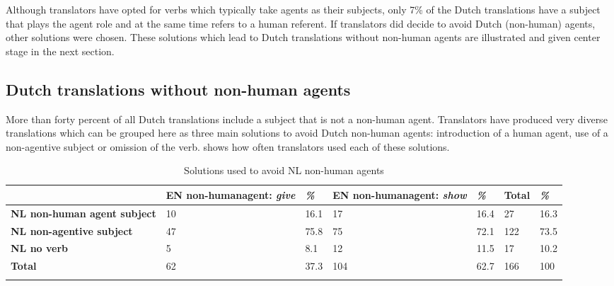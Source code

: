 \documentclass[output=paper]{LSP/langsci}
\begin{document}


Although translators have opted for verbs which typically take agents as their subjects, only 7\% of the Dutch translations have a subject that plays the agent role and at the same time refers to a human referent. If translators did decide to avoid Dutch (non-human) agents, other solutions were chosen. These solutions which lead to Dutch translations without non-human agents are illustrated and given center stage in the next section.  

\subsection{Dutch translations without non-human agents} \label{sec:5:6:2}
More than forty percent of all Dutch translations include a subject that is not a non-human agent. Translators have produced very diverse translations which can be grouped here as three main solutions to avoid Dutch non-human agents: introduction of a human agent, use of a non-agentive subject or omission of the verb.  shows how often translators used each of these solutions. 

\begin{table}
     \centering
     \begin{tabularx}{\textwidth}{XXXXXXX}
     \lsptoprule
                  &  EN non-human\newline agent: \textit{give}   & \textit{\%}  & EN non-human\newline agent: \textit{show}  & \textit{\%} & Total & \textit{\%} \\ \midrule
       \textbf{NL non-human agent subject}  & 10          & 16.1     & 17	          & 16.4      & 27   & 16.3 \\
       \textbf{NL non-agentive subject}     & 47          & 75.8     & 75             & 72.1       & 122   & 73.5  \\
       \textbf{NL no verb}           & 5    & 8.1         & 12       & 11.5       & 17   & 10.2 \\  \midrule
       \textbf{Total}                & 62   & 37.3        & 104      & 62.7       & 166   & 100  \\ 
       
     \lspbottomrule
     \end{tabularx}
 
     \caption{Solutions used to avoid NL non-human agents}
     \label{tab:5:3}
 
   \end{table}
\end{document}

